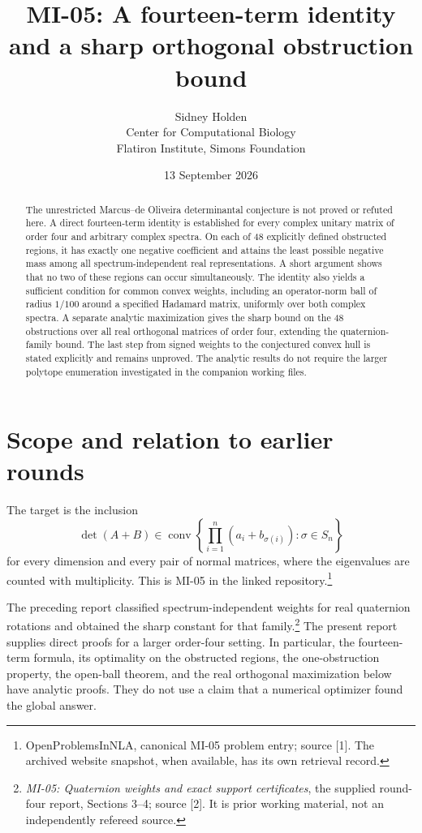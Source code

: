 \documentclass[11pt,a4paper]{article}
\title{MI-05: A fourteen-term identity and a sharp orthogonal obstruction bound}
\author{Sidney Holden\\{\small Center for Computational Biology}\\{\small Flatiron Institute, Simons Foundation}}\date{13 September 2026}
\newcommand{\conv}{\operatorname{conv}}
\begin{document}
\maketitle
\begin{abstract}
The unrestricted Marcus--de Oliveira determinantal conjecture is not proved or refuted here. A direct fourteen-term identity is established for every complex unitary matrix of order four and arbitrary complex spectra. On each of 48 explicitly defined obstructed regions, it has exactly one negative coefficient and attains the least possible negative mass among all spectrum-independent real representations. A short argument shows that no two of these regions can occur simultaneously. The identity also yields a sufficient condition for common convex weights, including an operator-norm ball of radius $1/100$ around a specified Hadamard matrix, uniformly over both complex spectra. A separate analytic maximization gives the sharp bound on the 48 obstructions over all real orthogonal matrices of order four, extending the quaternion-family bound. The last step from signed weights to the conjectured convex hull is stated explicitly and remains unproved. The analytic results do not require the larger polytope enumeration investigated in the companion working files.
\end{abstract}

\section*{Scope and relation to earlier rounds}
The target is the inclusion
\begin{equation}\label{eq:target}
\det(A+B)\in\conv\left\{\prod_{i=1}^n(a_i+b_{\sigma(i)}):\sigma\in S_n\right\}
\end{equation}
for every dimension and every pair of normal matrices, where the eigenvalues are counted with multiplicity. This is MI-05 in the linked repository.\footnote{OpenProblemsInNLA, canonical MI-05 problem entry; source [1]. The archived website snapshot, when available, has its own retrieval record.}

The preceding report classified spectrum-independent weights for real quaternion rotations and obtained the sharp constant for that family.\footnote{\emph{MI-05: Quaternion weights and exact support certificates}, the supplied round-four report, Sections 3--4; source [2]. It is prior working material, not an independently refereed source.} The present report supplies direct proofs for a larger order-four setting. In particular, the fourteen-term formula, its optimality on the obstructed regions, the one-obstruction property, the open-ball theorem, and the real orthogonal maximization below have analytic proofs. They do not use a claim that a numerical optimizer found the global answer.
\end{document}
